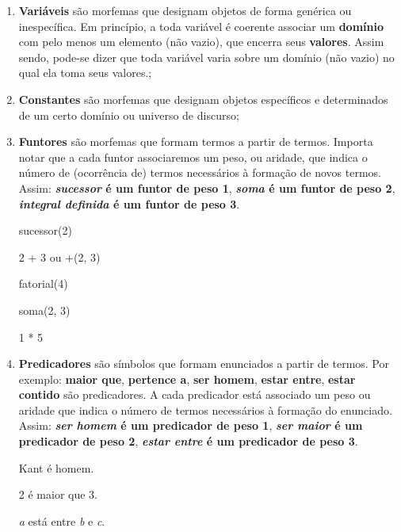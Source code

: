 \begin{enumerate}[label=\arabic*)]
    \item \textbf{Variáveis} são morfemas que designam objetos de forma genérica ou inespecífica.
    Em princípio, a toda variável é coerente associar um \textbf{domínio} com pelo menos um elemento (não vazio), que encerra seus \textbf{valores}.
    Assim sendo, pode-se dizer que toda variável varia sobre um domínio (não vazio) no qual ela toma seus valores.;

    \item \textbf{Constantes} são morfemas que designam objetos específicos e determinados de um certo domínio ou universo de discurso;

    \item \textbf{Funtores} são morfemas que formam termos a partir de termos.
    Importa notar que a cada funtor associaremos um peso, ou aridade, que indica o número de (ocorrência de) termos necessários à formação de novos termos.
    Assim: \textbf{\textit{sucessor} é um funtor de peso 1}, \textbf{\textit{soma} é um funtor de peso 2}, \textbf{\textit{integral definida} é um funtor de peso 3}.

    \begin{exemplo}
            sucessor(2)
    \end{exemplo}
    \begin{exemplo}
            2 + 3 ou +(2, 3)
    \end{exemplo}
    \begin{exemplo}
            fatorial(4)
    \end{exemplo}
    \begin{exemplo}
            soma(2, 3)
    \end{exemplo}
    \begin{exemplo}
            1 * 5
    \end{exemplo}

    \item \textbf{Predicadores} são símbolos que formam enunciados a partir de termos.
    Por exemplo: \textbf{maior que}, \textbf{pertence a}, \textbf{ser homem}, \textbf{estar entre}, \textbf{estar contido} são predicadores.
    A cada predicador está associado um peso ou aridade que indica o número de termos necessários à formação do enunciado.
    Assim: \textbf{\textit{ser homem} é um predicador de peso 1}, \textbf{\textit{ser maior} é um predicador de peso 2}, \textbf{\textit{estar entre} é um predicador de peso 3}.

    \setcounter{exemplo}{0}
    \begin{exemplo}
        Kant é homem.
    \end{exemplo}
    \begin{exemplo}
        2 é maior que 3.
    \end{exemplo}
    \begin{exemplo}
        \textit{a} está entre \textit{b} e \textit{c}.
    \end{exemplo}


\end{enumerate}
